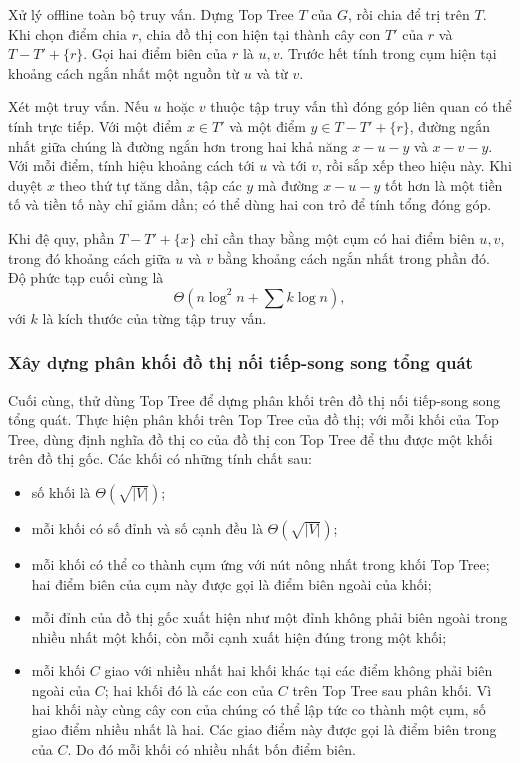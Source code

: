 \documentclass[11pt]{article}
\begin{document}
Xử lý offline toàn bộ truy vấn. Dựng Top Tree \(T\) của \(G\), rồi chia để trị
trên \(T\). Khi chọn điểm chia \(r\), chia đồ thị con hiện tại thành cây con
\(T'\) của \(r\) và \(T-T'+\{r\}\). Gọi hai điểm biên của \(r\) là \(u,v\).
Trước hết tính trong cụm hiện tại khoảng cách ngắn nhất một nguồn từ \(u\) và
từ \(v\).

Xét một truy vấn. Nếu \(u\) hoặc \(v\) thuộc tập truy vấn thì đóng góp liên
quan có thể tính trực tiếp. Với một điểm \(x\in T'\) và một điểm
\(y\in T-T'+\{r\}\), đường ngắn nhất giữa chúng là đường ngắn hơn trong hai
khả năng \(x-u-y\) và \(x-v-y\). Với mỗi điểm, tính hiệu khoảng cách tới \(u\)
và tới \(v\), rồi sắp xếp theo hiệu này. Khi duyệt \(x\) theo thứ tự tăng dần,
tập các \(y\) mà đường \(x-u-y\) tốt hơn là một tiền tố và tiền tố này chỉ
giảm dần; có thể dùng hai con trỏ để tính tổng đóng góp.

Khi đệ quy, phần \(T-T'+\{x\}\) chỉ cần thay bằng một cụm có hai điểm biên
\(u,v\), trong đó khoảng cách giữa \(u\) và \(v\) bằng khoảng cách ngắn nhất
trong phần đó. Độ phức tạp cuối cùng là
\[
  \Theta\left(n\log^2 n+\sum k\log n\right),
\]
với \(k\) là kích thước của từng tập truy vấn.

\subsubsection{Xây dựng phân khối đồ thị nối tiếp-song song tổng quát}

Cuối cùng, thử dùng Top Tree để dựng phân khối trên đồ thị nối tiếp-song song
tổng quát. Thực hiện phân khối trên Top Tree của đồ thị; với mỗi khối của Top
Tree, dùng định nghĩa đồ thị co của đồ thị con Top Tree để thu được một khối
trên đồ thị gốc. Các khối có những tính chất sau:
\begin{itemize}
  \item số khối là \(\Theta(\sqrt{|V|})\);
  \item mỗi khối có số đỉnh và số cạnh đều là \(\Theta(\sqrt{|V|})\);
  \item mỗi khối có thể co thành cụm ứng với nút nông nhất trong khối Top Tree;
  hai điểm biên của cụm này được gọi là điểm biên ngoài của khối;
  \item mỗi đỉnh của đồ thị gốc xuất hiện như một đỉnh không phải biên ngoài
  trong nhiều nhất một khối, còn mỗi cạnh xuất hiện đúng trong một khối;
  \item mỗi khối \(C\) giao với nhiều nhất hai khối khác tại các điểm không
  phải biên ngoài của \(C\); hai khối đó là các con của \(C\) trên Top Tree sau
  phân khối. Vì hai khối này cùng cây con của chúng có thể lập tức co thành
  một cụm, số giao điểm nhiều nhất là hai. Các giao điểm này được gọi là điểm
  biên trong của \(C\). Do đó mỗi khối có nhiều nhất bốn điểm biên.
\end{itemize}
\end{document}
